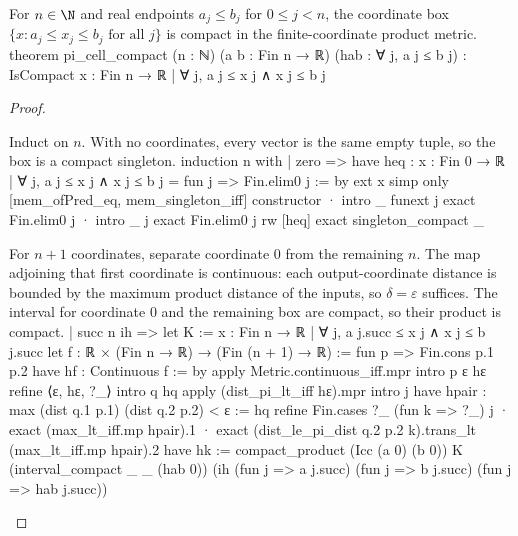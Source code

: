 \begin{lemma} \label{an1:lem:pi-cell-compact}
  \begin{lean}{For $n\in\N$ and real endpoints $a_j\leq b_j$ for $0\leq j<n$, the coordinate box $\{x: a_j\leq x_j\leq b_j\text{ for all }j\}$ is compact in the finite-coordinate product metric.}
    theorem pi_cell_compact (n : ℕ) (a b : Fin n → ℝ) (hab : ∀ j, a j ≤ b j) :
        IsCompact {x : Fin n → ℝ | ∀ j, a j ≤ x j ∧ x j ≤ b j}
  \end{lean}
\end{lemma}

\begin{proof}
  \begin{lean}{Induct on $n$. With no coordinates, every vector is the same empty tuple, so the box is a compact singleton.}
    induction n with
    | zero =>
      have heq : {x : Fin 0 → ℝ | ∀ j, a j ≤ x j ∧ x j ≤ b j} = {fun j => Fin.elim0 j} := by
        ext x
        simp only [mem_ofPred_eq, mem_singleton_iff]
        constructor
        · intro _
          funext j
          exact Fin.elim0 j
        · intro _ j
          exact Fin.elim0 j
      rw [heq]
      exact singleton_compact _
  \end{lean}

  \begin{lean}{For $n+1$ coordinates, separate coordinate $0$ from the remaining $n$. The map adjoining that first coordinate is continuous: each output-coordinate distance is bounded by the maximum product distance of the inputs, so $\delta=\varepsilon$ suffices. The interval for coordinate $0$ and the remaining box are compact, so their product is compact.}
    | succ n ih =>
      let K := {x : Fin n → ℝ | ∀ j, a j.succ ≤ x j ∧ x j ≤ b j.succ}
      let f : ℝ × (Fin n → ℝ) → (Fin (n + 1) → ℝ) := fun p => Fin.cons p.1 p.2
      have hf : Continuous f := by
        apply Metric.continuous_iff.mpr
        intro p ε hε
        refine ⟨ε, hε, ?_⟩
        intro q hq
        apply (dist_pi_lt_iff hε).mpr
        intro j
        have hpair : max (dist q.1 p.1) (dist q.2 p.2) < ε := hq
        refine Fin.cases ?_ (fun k => ?_) j
        · exact (max_lt_iff.mp hpair).1
        · exact (dist_le_pi_dist q.2 p.2 k).trans_lt (max_lt_iff.mp hpair).2
      have hk := compact_product (Icc (a 0) (b 0)) K (interval_compact _ _ (hab 0))
        (ih (fun j => a j.succ) (fun j => b j.succ) (fun j => hab j.succ))
  \end{lean}


\end{proof}
